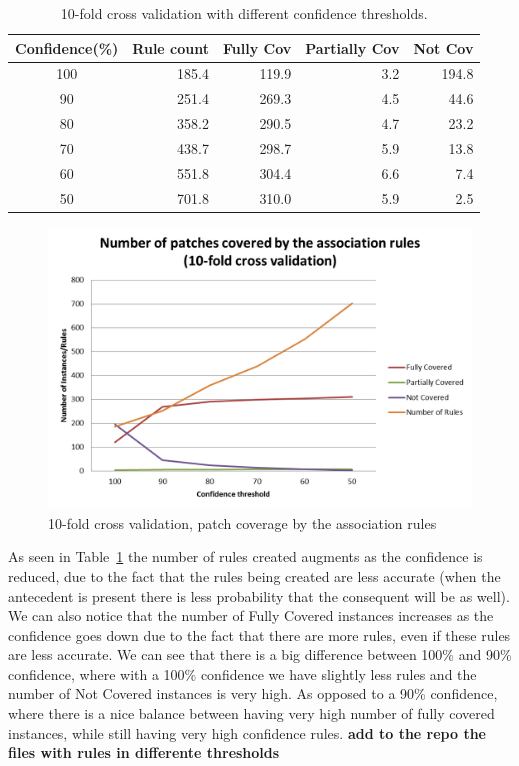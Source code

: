 \documentclass[conference]{IEEEtran}
\newcommand{\todo}[1]
  {{\scriptsize \textbf{\color{red} {#1}}}}
\begin{document}
\begin{table}[ht]
\centering

\begin{tabular}{|c|rrrr|}
\toprule
 Confidence(\%) & Rule count & Fully Cov & Partially Cov & Not Cov \\
\midrule
100 & 185.4 & 119.9 & 3.2 & 194.8 \\
90 & 251.4  & 269.3 & 4.5 & 44.6 \\
80 & 358.2  & 290.5 & 4.7 & 23.2 \\
70 & 438.7 & 298.7 & 5.9 & 13.8 \\
60 & 551.8 & 304.4 & 6.6 & 7.4   \\
50 & 701.8 & 310.0 & 5.9 & 2.5 \\
\bottomrule
\end{tabular}
\center
  \caption{10-fold cross validation with different confidence thresholds. \label{10FoldXValResults}}
\end{table} 

\begin{figure}[!h]
  \centering
    \includegraphics[width=\columnwidth]{10FoldXVal2}
  \caption{10-fold cross validation, patch coverage by the association rules}
  \label{fig:generateandvalidate}
\end{figure}

As seen in Table~\ref{10FoldXValResults} the number of rules created augments as the confidence is reduced, due to the fact that the rules being created are less accurate (when the antecedent is present there is less probability that the consequent will be as well). We can also notice that the number of Fully Covered instances increases as the confidence goes down due to the fact that there are more rules, even if these rules are less accurate.
We can see that there is a big difference between 100\% and 90\% confidence, where with a 100\% confidence we have slightly less rules and the number of Not Covered instances is very high. As opposed to a 90\% confidence, where there is a nice balance between having very high number of fully covered instances, while still having very high confidence rules. \todo{add to the repo the files with rules in differente thresholds}
\end{document}
